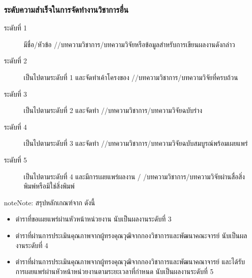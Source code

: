 \documentclass[a4paper,12pt,english]{sphinxmanual}
\begin{document}
\subsubsection{ระดับความสำเร็จในการจัดทำงานวิชาการอื่น}
\label{\detokenize{submission_part1:id16}}\begin{description}
\item[{ระดับที่ 1}] \leavevmode
มีชื่อ/หัวข้อ {\hyperref[\detokenize{glossary:term-3}]{}}/{\hyperref[\detokenize{glossary:term-2}]{}}/บทความวิชาการ/บทความวิจัยหรือข้อมูลสำหรับการเขียนผลงานดังกล่าว

\item[{ระดับที่ 2}] \leavevmode
เป็นไปตามระดับที่ 1 และจัดทำเค้าโครงของ {\hyperref[\detokenize{glossary:term-3}]{}}/{\hyperref[\detokenize{glossary:term-2}]{}}/บทความวิชาการ/บทความวิจัยที่ครบถ้วน

\item[{ระดับที่ 3}] \leavevmode
เป็นไปตามระดับที่ 2 และจัดทำ {\hyperref[\detokenize{glossary:term-3}]{}}/{\hyperref[\detokenize{glossary:term-2}]{}}/บทความวิชาการ/บทความวิจัยฉบับร่าง

\item[{ระดับที่ 4}] \leavevmode
เป็นไปตามระดับที่ 3 และจัดทำ {\hyperref[\detokenize{glossary:term-3}]{}}/{\hyperref[\detokenize{glossary:term-2}]{}}/บทความวิชาการ/บทความวิจัยฉบับสมบูรณ์พร้อมเผยแพร่

\item[{ระดับที่ 5}] \leavevmode
เป็นไปตามระดับที่ 4 และมีการเผยแพร่ผลงาน {\hyperref[\detokenize{glossary:term-3}]{}}/ {\hyperref[\detokenize{glossary:term-2}]{}}/บทความวิชาการ/บทความวิจัยผ่านสื่อสิ่งพิมพ์หรือมิใช่สิ่งพิมพ์

\end{description}

\begin{sphinxadmonition}{note}{Note:}
สรุปหลักเกณฑ์จาก {\hyperref[\detokenize{official_documents:official-documents}]{}} ดังนี้
\begin{itemize}
\item {} 
ตำราที่ขอเผยแพร่ผ่านหัวหน้าหน่วยงาน นับเป็นผลงานระดับที่ 3

\item {} 
ตำราที่ผ่านการประเมินคุณภาพจากผู้ทรงคุณวุฒิจากกองวิชาการและพัฒนาคณะจารย์ นับเป็นผลงานระดับที่ 4

\item {} 
ตำราที่ผ่านการประเมินคุณภาพจากผู้ทรงคุณวุฒิจากกองวิชาการและพัฒนาคณาจารย์ และได้รับการเผยแพร่ผ่านหัวหน้าหน่วยงานตามระยะเวลาที่กำหนด นับเป็นผลงานระดับที่ 5

\end{itemize}
\end{sphinxadmonition}
\end{document}
